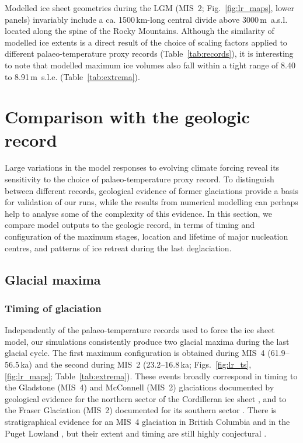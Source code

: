 \documentclass[tc, manuscript]{copernicus}
\begin{document}
Modelled ice sheet geometries during the LGM (MIS~2; Fig.~\ref{fig:lr_maps},
lower panels) invariably include a ca. 1500\,km-long central divide above
3000\,m~a.s.l. located along the spine of the Rocky Mountains. Although the
similarity of modelled ice extents is a direct result of the choice of scaling
factors applied to different palaeo-temperature proxy records
(Table~\ref{tab:records}), it is interesting to note that modelled maximum ice
volumes also fall within a tight range of 8.40 to 8.91\,m~s.l.e.
(Table~\ref{tab:extrema}).


\section{Comparison with the geologic record}
\label{sec:discussion}

Large variations in the model responses to evolving climate forcing reveal its
sensitivity to the choice of palaeo-temperature proxy record. To distinguish
between different records, geological evidence of former glaciations
provide a basis for validation of our runs, while the results from numerical
modelling can perhaps help to analyse some of the complexity of this evidence.
In this section, we compare model outputs to the geologic record, in terms of
timing and configuration of the maximum stages, location and lifetime of
major nucleation centres, and patterns of ice retreat during the last
deglaciation.

\subsection{Glacial maxima}

\subsubsection{Timing of glaciation}
\label{sec:timing}

Independently of the palaeo-temperature records
used to force the ice sheet model, our simulations consistently produce two
glacial maxima during the last glacial cycle. The first maximum configuration
is obtained during MIS~4 (61.9--56.5\,ka) and the second during MIS~2
(23.2--16.8\,ka; Figs.~\ref{fig:lr_ts}, \ref{fig:lr_maps};
Table~\ref{tab:extrema}). These events broadly correspond in timing to the
Gladstone
(MIS~4) and McConnell (MIS~2) glaciations documented by geological evidence for
the northern sector of the Cordilleran ice sheet
    \citep{Duk-Rodkin.etal.1996, Ward.etal.2007,
           Stroeven.etal.2010, Stroeven.etal.2014},
and to the Fraser Glaciation (MIS~2) documented for its southern sector
    \citep{Porter.Swanson.1998, Margold.etal.2014}.
There is stratigraphical evidence for an MIS~4 glaciation in British Columbia
\citep{Clague.Ward.2011} and in the Puget Lowland \citep{Troost.2014}, but
their extent and timing are still highly conjectural
    \citep[perhaps MIS~4 or early MIS~3; e.g.,][]{Cosma.etal.2008}.
\end{document}
